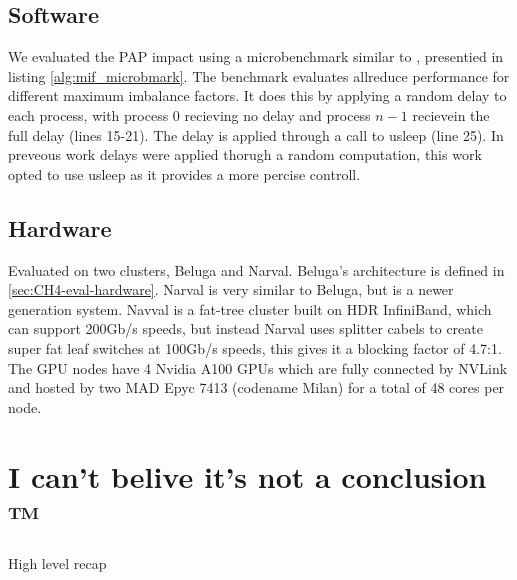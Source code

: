 


\subsection{Software}
We evaluated the PAP impact using a microbenchmark similar to \cite{Faraj2008StudyProcArrivalMPIColl}, presentied in listing \ref{alg:mif_microbmark}.
The benchmark evaluates allreduce performance for different maximum imbalance factors. 
It does this by applying a random delay to each process, with process 0 recieving no delay and process $n-1$ recievein the full delay (lines 15-21).
The delay is applied through a call to usleep (line 25).
In preveous work \cite{Faraj2008StudyProcArrivalMPIColl, Alizadeh2022PAPCollDL} delays were applied thorugh a random computation, this work opted to use usleep as it provides a more percise controll.



\subsection{Hardware}
Evaluated on two clusters, Beluga and Narval.
Beluga's architecture is defined in \ref{sec:CH4-eval-hardware}.
Narval is very similar to Beluga, but is a newer generation system.
Navval is a fat-tree cluster built on HDR InfiniBand, which can support 200Gb/s speeds, but instead Narval uses splitter cabels to create super fat leaf switches at 100Gb/s speeds, this gives it a blocking factor of 4.7:1.
The GPU nodes have 4 Nvidia A100 GPUs which are fully connected by NVLink and hosted by two MAD Epyc 7413 (codename Milan) for a total of 48 cores per node.





% 

\section{I can't belive it's not a conclusion ™}
High level recap

